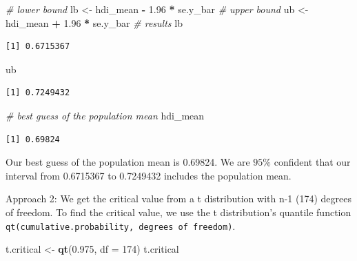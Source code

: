 \documentclass[]{article}
\newenvironment{Shaded}{\begin{snugshade}}{\end{snugshade}}
\newcommand{\KeywordTok}[1]{\textcolor[rgb]{0.13,0.29,0.53}{\textbf{#1}}}
\newcommand{\DataTypeTok}[1]{\textcolor[rgb]{0.13,0.29,0.53}{#1}}
\newcommand{\DecValTok}[1]{\textcolor[rgb]{0.00,0.00,0.81}{#1}}
\newcommand{\FloatTok}[1]{\textcolor[rgb]{0.00,0.00,0.81}{#1}}
\newcommand{\StringTok}[1]{\textcolor[rgb]{0.31,0.60,0.02}{#1}}
\newcommand{\CommentTok}[1]{\textcolor[rgb]{0.56,0.35,0.01}{\textit{#1}}}
\newcommand{\OperatorTok}[1]{\textcolor[rgb]{0.81,0.36,0.00}{\textbf{#1}}}
\newcommand{\NormalTok}[1]{#1}
\theoremstyle{definition}
\theoremstyle{definition}
\theoremstyle{definition}
\theoremstyle{remark}
\begin{document}
\begin{Shaded}
\begin{Highlighting}[]
\CommentTok{# lower bound}
\NormalTok{lb <-}\StringTok{ }\NormalTok{hdi_mean }\OperatorTok{-}\StringTok{ }\FloatTok{1.96} \OperatorTok{*}\StringTok{ }\NormalTok{se.y_bar}
\CommentTok{# upper bound}
\NormalTok{ub <-}\StringTok{ }\NormalTok{hdi_mean }\OperatorTok{+}\StringTok{ }\FloatTok{1.96} \OperatorTok{*}\StringTok{ }\NormalTok{se.y_bar}
\CommentTok{# results}
\NormalTok{lb}
\end{Highlighting}
\end{Shaded}

\begin{verbatim}
[1] 0.6715367
\end{verbatim}

\begin{Shaded}
\begin{Highlighting}[]
\NormalTok{ub}
\end{Highlighting}
\end{Shaded}

\begin{verbatim}
[1] 0.7249432
\end{verbatim}

\begin{Shaded}
\begin{Highlighting}[]
\CommentTok{# best guess of the population mean}
\NormalTok{hdi_mean}
\end{Highlighting}
\end{Shaded}

\begin{verbatim}
[1] 0.69824
\end{verbatim}

Our best guess of the population mean is 0.69824. We are \(95\%\)
confident that our interval from 0.6715367 to 0.7249432 includes the
population mean.

Approach 2: We get the critical value from a t distribution with n-1
(174) degrees of freedom. To find the critical value, we use the t
distribution's quantile function
\texttt{qt(cumulative.probability,\ degrees\ of\ freedom)}.

\begin{Shaded}
\begin{Highlighting}[]
\NormalTok{t.critical <-}\StringTok{ }\KeywordTok{qt}\NormalTok{(}\FloatTok{0.975}\NormalTok{, }\DataTypeTok{df =} \DecValTok{174}\NormalTok{) }
\NormalTok{t.critical}
\end{Highlighting}
\end{Shaded}
\end{document}
